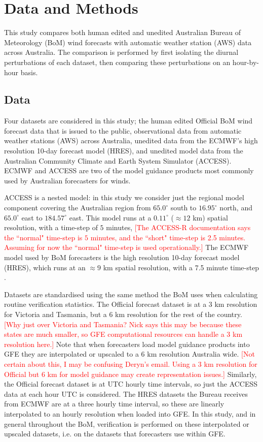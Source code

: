 \documentclass[twocol]{ametsoc}
\begin{document}
\section{Data and Methods} \label{Sec:Methods}
This study compares both human edited and unedited Australian Bureau of Meteorology (BoM) wind forecasts with automatic weather station (AWS) data across Australia. The comparison is performed by first isolating the diurnal perturbations of each dataset, then comparing these perturbations on an hour-by-hour basis.

\subsection{Data}
Four datasets are considered in this study; the human edited Official BoM wind forecast data that is issued to the public, observational data from automatic weather stations (AWS) across Australia, unedited data from the ECMWF's high resolution 10-day forecast model (HRES), and unedited model data from the Australian Community Climate and Earth System Simulator (ACCESS). ECMWF and ACCESS are two of the model guidance products most commonly used by Australian forecasters for winds.

ACCESS is a nested model: in this study we consider just the regional model component covering the Australian region from $65.0^\circ$ south to $16.95^\circ$ north, and $65.0^\circ$ east to $184.57^\circ$ east. This model runs at a $0.11^\circ$ ($\approx 12$ km) spatial resolution, with a time-step of $5$ minutes, \textcolor{red}{[The ACCESS-R documentation \citep{bom16} says the ``normal" time-step is $5$ minutes, and the ``short" time-step is 2.5 minutes. Assuming for now the ``normal" time-step is used operationally.]} The ECMWF model used by BoM forecasters is the high resolution 10-day forecast model (HRES), which runs at an $\approx 9$ km spatial resolution, with a 7.5 minute time-step \citet{ecmwf19b}.

Datasets are standardised using the same method the BoM uses when calculating routine verification statistics. The Official forecast dataset is at a 3 km resolution for Victoria and Tasmania, but a 6 km resolution for the rest of the country. \textcolor{red}{[Why just over Victoria and Tasmania? Nick says this may be because these states are much smaller, so GFE computational resources can handle a 3 km resolution here.]} Note that when forecasters load model guidance products into GFE they are interpolated or upscaled to a 6 km resolution Australia wide. \textcolor{red}{[Not certain about this, I may be confusing Deryn's email. Using a 3 km resolution for Official but 6 km for model guidance may create representation issues.]} Similarly, the Official forecast dataset is at UTC hourly time intervals, so just the ACCESS data at each hour UTC is considered. The HRES datasets the Bureau receives from ECMWF are at a three hourly time interval, so these are linearly interpolated to an hourly resolution when loaded into GFE. In this study, and in general throughout the BoM, verification is performed on these interpolated or upscaled datasets, i.e. on the datasets that forecasters use within GFE.
 
\end{document}
